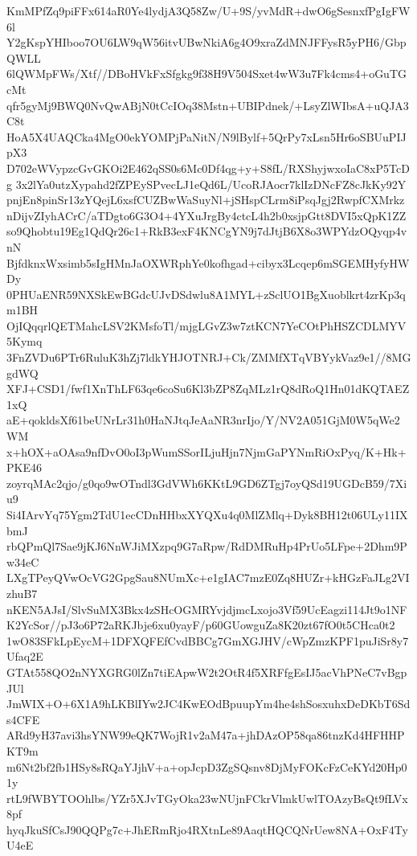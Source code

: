 KmMPfZq9piFFx614aR0Ye4lydjA3Q58Zw/U+9S/yvMdR+dwO6gSesnxfPgIgFW6l
Y2gKspYHIboo7OU6LW9qW56itvUBwNkiA6g4O9xraZdMNJFFysR5yPH6/GbpQWLL
6lQWMpFWs/Xtf//DBoHVkFxSfgkg9f38H9V504Sxet4wW3u7Fk4cms4+oGuTGcMt
qfr5gyMj9BWQ0NvQwABjN0tCcIOq38Mstn+UBIPdnek/+LsyZlWIbsA+uQJA3C8t
HoA5X4UAQCka4MgO0ekYOMPjPaNitN/N9lBylf+5QrPy7xLsn5Hr6oSBUuPIJpX3
D702eWVypzcGvGKOi2E462qSS0s6Mc0Df4qg+y+S8fL/RXShyjwxoIaC8xP5TcDg
3x2lYa0utzXypahd2fZPEySPvecLJ1eQd6L/UcoRJAocr7klIzDNcFZ8cJkKy92Y
pnjEn8pinSr13zYQejL6xsfCUZBwWaSuyNl+jSHspCLrm8iPsqJgj2RwpfCXMrkz
nDijvZIyhACrC/aTDgto6G3O4+4YXuJrgBy4ctcL4h2b0xsjpGtt8DVI5xQpK1ZZ
so9Qhobtu19Eg1QdQr26c1+RkB3exF4KNCgYN9j7dJtjB6X8o3WPYdzOQyqp4vnN
BjfdknxWxsimb5sIgHMnJaOXWRphYe0kofhgad+cibyx3Lcqep6mSGEMHyfyHWDy
0PHUaENR59NXSkEwBGdcUJvDSdwlu8A1MYL+zSclUO1BgXuoblkrt4zrKp3qm1BH
OjIQqqrlQETMahcLSV2KMsfoTl/mjgLGvZ3w7ztKCN7YeCOtPhHSZCDLMYV5Kymq
3FnZVDu6PTr6RuluK3hZj7ldkYHJOTNRJ+Ck/ZMMfXTqVBYykVaz9e1//8MGgdWQ
XFJ+CSD1/fwf1XnThLF63qe6coSu6Kl3bZP8ZqMLz1rQ8dRoQ1Hn01dKQTAEZ1xQ
aE+qokldsXf61beUNrLr31h0HaNJtqJeAaNR3nrIjo/Y/NV2A051GjM0W5qWe2WM
x+hOX+aOAsa9nfDvO0oI3pWumSSorILjuHjn7NjmGaPYNmRiOxPyq/K+Hk+PKE46
zoyrqMAc2qjo/g0qo9wOTndl3GdVWh6KKtL9GD6ZTgj7oyQSd19UGDcB59/7Xiu9
Si4IArvYq75Ygm2TdU1ecCDnHHbxXYQXu4q0MlZMlq+Dyk8BH12t06ULy11IXbmJ
rbQPmQl7Sae9jKJ6NnWJiMXzpq9G7aRpw/RdDMRuHp4PrUo5LFpe+2Dhm9Pw34eC
LXgTPeyQVwOcVG2GpgSau8NUmXc+e1gIAC7mzE0Zq8HUZr+kHGzFaJLg2VIzhuB7
nKEN5AJsI/SlvSuMX3Bkx4zSHcOGMRYvjdjmcLxojo3Vf59UcEagzi114Jt9o1NF
K2YcSor//pJ3o6P72aRKJbje6xu0yayF/p60GUowguZa8K20zt67fO0t5CHca0t2
1wO83SFkLpEycM+1DFXQFEfCvdBBCg7GmXGJHV/cWpZmzKPF1puJiSr8y7Ufaq2E
GTAt558QO2nNYXGRG0lZn7tiEApwW2t2OtR4f5XRFfgEsIJ5acVhPNeC7vBgpJUl
JmWIX+O+6X1A9hLKBlIYw2JC4KwEOdBpuupYm4he4shSosxuhxDeDKbT6Sds4CFE
ARd9yH37avi3hsYNW99eQK7WojR1v2aM47a+jhDAzOP58qa86tnzKd4HFHHPKT9m
m6Nt2bf2fb1HSy8sRQaYJjhV+a+opJcpD3ZgSQsnv8DjMyFOKcFzCeKYd20Hp01y
rtL9fWBYTOOhlbs/YZr5XJvTGyOka23wNUjnFCkrVlmkUwlTOAzyBsQt9fLVx8pf
hyqJkuSfCsJ90QQPg7c+JhERmRjo4RXtnLe89AaqtHQCQNrUew8NA+OxF4TyU4eE
